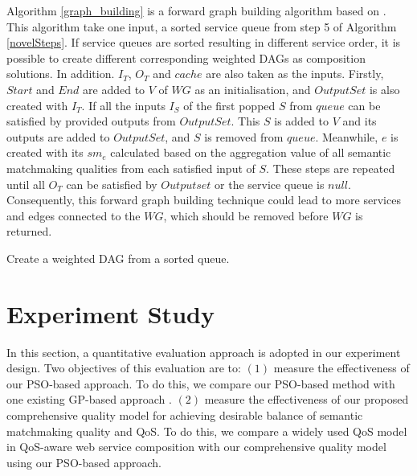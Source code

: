 \documentclass{llncs}
\begin{document}
Algorithm  \ref{graph_building} is a forward graph building algorithm based on \cite{blum1997fast}. This algorithm take one input, a sorted service queue from step 5 of Algorithm \ref{novelSteps}. If service queues are sorted resulting in different service order, it is possible to create different corresponding weighted DAGs as composition solutions. In addition. $I_{T}$, $O_{T}$ and $cache$ are also taken as the inputs. Firstly, $Start$ and $End$ are added to $V$ of $WG$ as an initialisation, and $OutputSet$ is also created with $I_{T}$.  If all the inputs $I_{S}$ of the first popped  $S$ from $queue$ can be satisfied by provided outputs from $OutputSet$. This $S$ is added to $V$ and its outputs are added to $OutputSet$, and $S$ is removed from $queue$. Meanwhile, $e$ is created with its $sm_{e}$ calculated based on the aggregation value of all semantic matchmaking qualities from each satisfied input of $S$. These steps are repeated until all  $O_{T}$ can be satisfied by $Outputset$ or the service queue is $null$. Consequently, this forward graph building technique could lead to more services and edges connected to the $WG$, which should be removed before $WG$ is returned.

\begin{algorithm}
 \SetNlSty{}{}{:}
 \caption{Create a weighted DAG from a  sorted queue.}
\label{graph_building}
\end{algorithm} 


\section{Experiment Study}\label{experiment_design}
In this section, a quantitative evaluation approach is adopted in our experiment design. Two objectives of this evaluation are to: $(1)$ measure the effectiveness of our PSO-based approach. To do this, we compare our PSO-based method with one existing GP-based approach \cite{ma2015hybrid}. $(2)$ measure the effectiveness of our proposed comprehensive quality model for achieving desirable balance of semantic matchmaking quality and QoS. To do this, we compare a widely used QoS model in QoS-aware web service composition \cite{ma2015hybrid,da2016particle,da2015graphevol} with our comprehensive quality model using our PSO-based approach.
\end{document}
